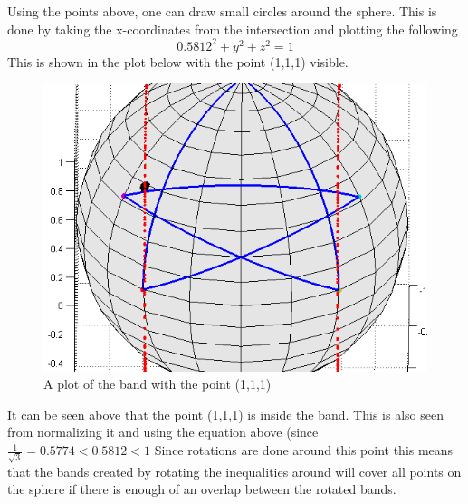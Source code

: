 Using the points above, one can draw small circles around the sphere. This is done by taking the x-coordinates from the intersection and plotting the following 
\begin{equation}
0.5812^2+y^2+z^2=1
\end{equation}
This is shown in the plot below with the point (1,1,1) visible.
\begin{figure}[H]
\begin{center}
\includegraphics[scale=0.5]{completeband111big.png}
\caption{A plot of the band with the point (1,1,1)}
\label{fig:completeband}
\end{center}
\end{figure}
It can be seen above that the point (1,1,1) is inside the band. This is also seen from normalizing it and using the equation above (since $\frac{1}{\sqrt{3}}=0.5774<0.5812<1$
Since rotations are done around this point this means that the bands created by rotating the inequalities around will cover all points on the sphere if there is enough of an overlap between the rotated bands. 
